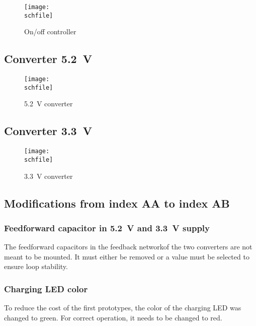 \begin{figure}[h!]
    \centering
    \texttt{[image: \\schfile]}
    \caption{On/off controller}
    \label{fig_onoff}
\end{figure}

\FloatBarrier

\subsection{Converter \SI{5.2}{\volt}}
\label{sec_power_5V2}

\begin{figure}[h!]
    \centering
    \texttt{[image: \\schfile]}
    \caption{\SI{5.2}{\volt} converter}
    \label{fig_power_5V2}
\end{figure}

\FloatBarrier

\subsection{Converter \SI{3.3}{\volt}}
\label{sec_power_3V3}

\begin{figure}[h!]
    \centering
    \texttt{[image: \\schfile]}
    \caption{\SI{3.3}{\volt} converter}
    \label{fig_power_3V3}
\end{figure}

\FloatBarrier

\subsection{Modifications from index AA to index AB}

\subsubsection{Feedforward capacitor in \SI{5.2}{\volt} and \SI{3.3}{\volt} supply}
The feedforward capacitors in the feedback networkof the two converters are not meant to be mounted. It must either be removed or a value must be selected to ensure loop stability. 

\subsubsection{Charging LED color}
To reduce the cost of the first prototypes, the color of the charging \ac{LED} was changed to green. For correct operation, it needs to be changed to red. 


